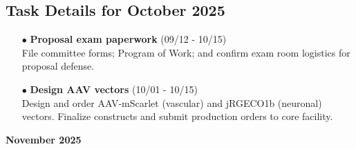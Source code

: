 \documentclass[landscape,a4paper]{article}
\begin{document}
\subsection{Task Details for October 2025}
\begin{itemize}[leftmargin=1cm]
    \item[\textcolor{other}{$\bullet$}] \textbf{Proposal exam paperwork} (09/12 - 10/15)\\ File committee forms; Program of Work; and confirm exam room logistics for proposal defense.
    \item[\textcolor{other}{$\bullet$}] \textbf{Design AAV vectors} (10/01 - 10/15)\\ Design and order AAV-mScarlet (vascular) and jRGECO1b (neuronal) vectors. Finalize constructs and submit production orders to core facility.
\end{itemize}

\newpage
\pagestyle{empty}

\begin{center}
{\large\textbf{November 2025}}
\end{center}

\vspace{0.5cm}
\end{document}
